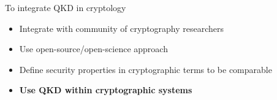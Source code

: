 \begin{frame}{To integrate QKD in cryptology}
  \small
  \begin{itemize}
    \item Integrate with community of cryptography researchers
    \item Use open-source/open-science approach
    \item Define security properties in cryptographic terms to be comparable
    \item \textbf{Use QKD within cryptographic systems}
  \end{itemize}
\end{frame}
